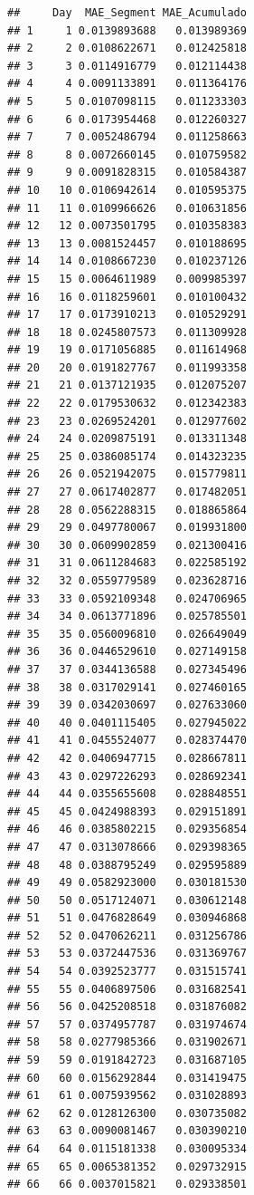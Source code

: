 \documentclass[
]{book}
\begin{document}
\begin{verbatim}
##     Day  MAE_Segment MAE_Acumulado
## 1     1 0.0139893688   0.013989369
## 2     2 0.0108622671   0.012425818
## 3     3 0.0114916779   0.012114438
## 4     4 0.0091133891   0.011364176
## 5     5 0.0107098115   0.011233303
## 6     6 0.0173954468   0.012260327
## 7     7 0.0052486794   0.011258663
## 8     8 0.0072660145   0.010759582
## 9     9 0.0091828315   0.010584387
## 10   10 0.0106942614   0.010595375
## 11   11 0.0109966626   0.010631856
## 12   12 0.0073501795   0.010358383
## 13   13 0.0081524457   0.010188695
## 14   14 0.0108667230   0.010237126
## 15   15 0.0064611989   0.009985397
## 16   16 0.0118259601   0.010100432
## 17   17 0.0173910213   0.010529291
## 18   18 0.0245807573   0.011309928
## 19   19 0.0171056885   0.011614968
## 20   20 0.0191827767   0.011993358
## 21   21 0.0137121935   0.012075207
## 22   22 0.0179530632   0.012342383
## 23   23 0.0269524201   0.012977602
## 24   24 0.0209875191   0.013311348
## 25   25 0.0386085174   0.014323235
## 26   26 0.0521942075   0.015779811
## 27   27 0.0617402877   0.017482051
## 28   28 0.0562288315   0.018865864
## 29   29 0.0497780067   0.019931800
## 30   30 0.0609902859   0.021300416
## 31   31 0.0611284683   0.022585192
## 32   32 0.0559779589   0.023628716
## 33   33 0.0592109348   0.024706965
## 34   34 0.0613771896   0.025785501
## 35   35 0.0560096810   0.026649049
## 36   36 0.0446529610   0.027149158
## 37   37 0.0344136588   0.027345496
## 38   38 0.0317029141   0.027460165
## 39   39 0.0342030697   0.027633060
## 40   40 0.0401115405   0.027945022
## 41   41 0.0455524077   0.028374470
## 42   42 0.0406947715   0.028667811
## 43   43 0.0297226293   0.028692341
## 44   44 0.0355655608   0.028848551
## 45   45 0.0424988393   0.029151891
## 46   46 0.0385802215   0.029356854
## 47   47 0.0313078666   0.029398365
## 48   48 0.0388795249   0.029595889
## 49   49 0.0582923000   0.030181530
## 50   50 0.0517124071   0.030612148
## 51   51 0.0476828649   0.030946868
## 52   52 0.0470626211   0.031256786
## 53   53 0.0372447536   0.031369767
## 54   54 0.0392523777   0.031515741
## 55   55 0.0406897506   0.031682541
## 56   56 0.0425208518   0.031876082
## 57   57 0.0374957787   0.031974674
## 58   58 0.0277985366   0.031902671
## 59   59 0.0191842723   0.031687105
## 60   60 0.0156292844   0.031419475
## 61   61 0.0075939562   0.031028893
## 62   62 0.0128126300   0.030735082
## 63   63 0.0090081467   0.030390210
## 64   64 0.0115181338   0.030095334
## 65   65 0.0065381352   0.029732915
## 66   66 0.0037015821   0.029338501

\end{verbatim}
\end{document}
